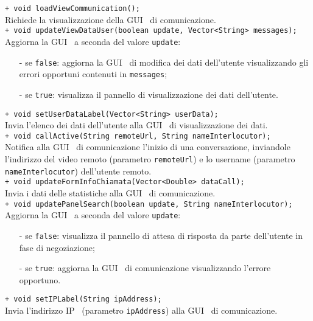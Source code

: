 {\begin{sloppypar}
{{\begin{itemize}
			\texttt{+ void loadViewCommunication();}\\
			Richiede la visualizzazione della GUI\g~ di comunicazione.\\

			\texttt{+ void updateViewDataUser(boolean update, Vector<String> messages);}\\
			Aggiorna la GUI\g~ a seconda del valore \texttt{update}:
			\begin{itemize}
				\item[-] se \texttt{false}: aggiorna la GUI\g~ di modifica dei dati dell'utente visualizzando gli errori opportuni contenuti in \texttt{messages};
				\item[-] se \texttt{true}: visualizza il pannello di visualizzazione dei dati dell'utente.\\
			\end{itemize}

			\texttt{+ void setUserDataLabel(Vector<String> userData);}\\
			Invia l'elenco dei dati dell'utente alla GUI\g~ di visualizzazione dei dati.\\

			\texttt{+ void callActive(String remoteUrl, String nameInterlocutor);}\\
			Notifica alla GUI\g~ di comunicazione l'inizio di una conversazione, inviandole l'indirizzo del video remoto (parametro \texttt{remoteUrl}) e lo username (parametro \texttt{nameInterlocutor}) dell'utente remoto.\\

			\texttt{+ void updateFormInfoChiamata(Vector<Double> dataCall);}\\
			Invia i dati delle statistiche alla GUI\g~ di comunicazione.\\

			\texttt{+ void updatePanelSearch(boolean update, String nameInterlocutor);}\\
			Aggiorna la GUI\g~ a seconda del valore \texttt{update}:
			\begin{itemize}
				\item[-] se \texttt{false}: visualizza il pannello di attesa di risposta da parte dell'utente in fase di negoziazione;
				\item[-] se \texttt{true}: aggiorna la GUI\g~ di comunicazione visualizzando l'errore opportuno.\\
			\end{itemize}
			\texttt{+ void setIPLabel(String ipAddress);}\\
			Invia l'indirizzo IP\g~ (parametro \texttt{ipAddress}) alla GUI\g~ di comunicazione.\\
			

\end{itemize}}}
\end{sloppypar}}
